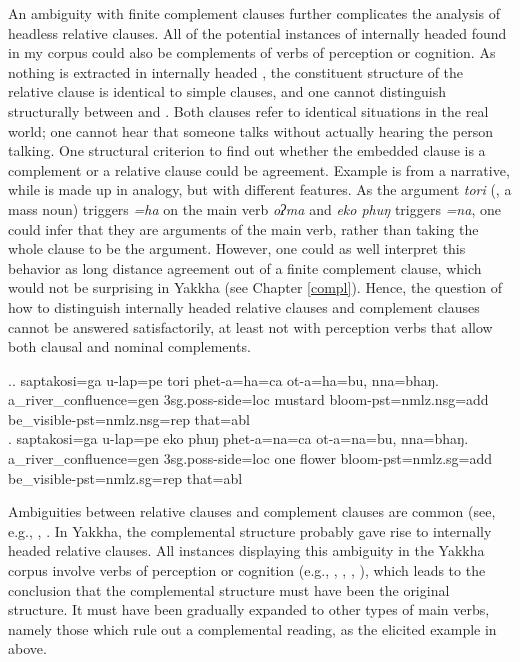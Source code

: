 An ambiguity with finite complement clauses further complicates the analysis of headless relative clauses. All of the potential instances of internally headed  found in my corpus could also be complements of  verbs of perception or cognition. As nothing is extracted in internally headed , the constituent structure of the relative clause is identical to simple clauses, and one cannot distinguish structurally between  and . Both clauses refer to identical situations in the real world; one cannot hear that someone talks without actually hearing the person talking. One structural criterion to find out whether the embedded clause is a complement or a relative clause could be agreement. Example \Next[a] is from a narrative, while \Next[b] is made up in analogy, but with different  features. As the argument \emph{tori} (, a mass noun) triggers \emph{=ha}  on the main verb \emph{oʔma}  and \emph{eko phuŋ}  triggers \emph{=na}, one could infer that they are arguments of the main verb, rather than taking the whole clause to be the argument. However, one could as well interpret this behavior as long distance agreement out of a finite complement clause, which would not be surprising in Yakkha  (see Chapter \ref{compl}). Hence, the question of how to distinguish internally headed relative clauses and complement clauses cannot be answered satisfactorily, at least not with perception verbs that allow both clausal and nominal complements. 

\ex.\ag. saptakosi=ga u-lap=pe tori phet-a=ha=ca ot-a=ha=bu, nna=bhaŋ.\\
		a\_river\_confluence{\sc =gen} {\sc 3sg.poss}-side{\sc =loc} mustard bloom{\sc [3sg]-pst=nmlz.nsg=add}  be\_visible{\sc [3sg]-pst=nmlz.nsg=rep} that{\sc =abl}	\\
	  
 \bg.	saptakosi=ga u-lap=pe eko phuŋ phet-a=na=ca ot-a=na=bu, nna=bhaŋ.\\
		a\_river\_confluence{\sc =gen} {\sc 3sg.poss}-side{\sc =loc} one flower bloom{\sc [3sg]-pst=nmlz.sg=add}  be\_visible{\sc [3sg]-pst=nmlz.sg=rep} that{\sc =abl}	\\

Ambiguities between relative clauses and complement clauses are common (see, e.g., \citet[272]{Bickel1999Nominalization}, \citet[120, 143]{Noonan2007Complementation}. In Yakkha, the complemental structure probably gave rise to internally headed relative clauses. All instances  displaying this ambiguity in the Yakkha corpus involve verbs of perception or cognition (e.g., , , , ), which leads to the conclusion that the complemental structure must have been the original structure. It must have been gradually expanded  to other types of main verbs, namely those which rule out a complemental reading, as the elicited example in \LLast above.




